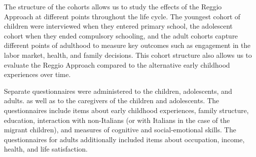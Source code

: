 \begin{table}[H]
\centering
{}
\end{table}

The structure of the cohorts allows us to study the effects of the Reggio Approach at different points throughout the life cycle. The youngest cohort of children were interviewed when they entered primary school, the adolescent cohort when they ended compulsory schooling, and the adult cohorts capture different points of adulthood to measure key outcomes such as engagement in the labor market, health, and family decisions. This cohort structure also allows us to evaluate the Reggio Approach compared to the alternative early childhood experiences over time.

Separate questionnaires were administered to the children, adolescents, and adults. as well as to the caregivers of the children and adolescents. The questionnaires include items about early childhood experiences, family structure, education, interaction with non-Italians (or with Italians in the case of the migrant children), and measures of cognitive and social-emotional skills. The questionnaires for adults additionally included items about occupation, income, health, and life satisfaction. 
